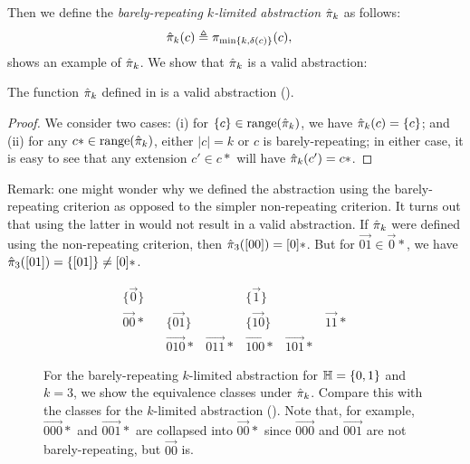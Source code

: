 Then we define the {\em barely-repeating $k$-limited abstraction} $\hat{\pi}_k$ as follows:
\begin{align}
\label{eqn:barelyAbstraction}
\hat{\pi}_k(c) & \triangleq \pi_{\min\{k,\delta(c)\}}(c),
\end{align}
 shows an example of $\hat{\pi}_k$.
We show that $\hat{\pi}_k$ is a valid abstraction:
\begin{proposition}
\label{prop:barelyAbstraction}
The function $\hat{\pi}_k$ defined in  is a valid abstraction
().
\end{proposition}
\begin{proof}
We consider two cases: (i) for $\{c\} \in \text{range}(\hat{\pi}_k)$,
we have $\hat{\pi}_k(c) = \{c\}$; and (ii) for any $c* \in \text{range}(\hat{\pi}_k)$,
either $|c| = k$ or $c$ is barely-repeating; in either case,
it is easy to see that any extension $c' \in c*$ will have $\hat{\pi}_k(c') = c*$.
\end{proof}
Remark: one might wonder why we defined the abstraction using the barely-repeating criterion
as opposed to the simpler non-repeating criterion.
It turns out that using the latter in  would not result in a valid abstraction.
If $\hat{\pi}_k$ were defined using the non-repeating criterion,
then $\hat{\pi}_3([00]) = [0]*$.
But for $\vec{01} \in \vec{0}*$, we have $\hat{\pi}_3([01]) = \{[01]\} \neq [0]*$.

\begin{figure}
\[
\begin{array}{lllllll}
\{\vec{0}\}    &            &              &            & \{\vec{1}\} \\
\vec{00}*      &            & \{\vec{01}\} &            & \{\vec{10}\} &            & \vec{11}* \\
               &            & \vec{010}*   & \vec{011}* & \vec{100}*   & \vec{101}* &
\end{array}
\]
\caption{\label{fig:barelyExample} For the barely-repeating $k$-limited abstraction
for ${\mathbb H} = \{0,1\}$ and $k = 3$, we show the equivalence classes under $\hat{\pi}_k$.
Compare this with the classes for the $k$-limited abstraction ().
Note that, for example,
$\vec{000}*$ and $\vec{001}*$ are collapsed into $\vec{00}*$ since $\vec{000}$ and $\vec{001}$ are not barely-repeating,
but $\vec{00}$ is.
}
\end{figure}


